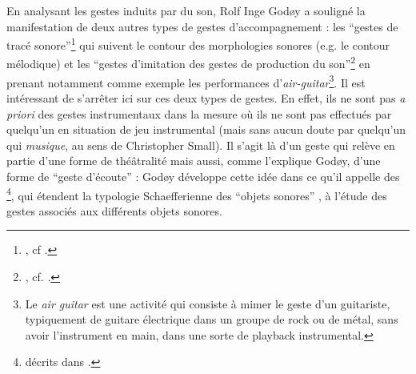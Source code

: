 \indent En analysant les gestes induits par du son, Rolf Inge Godøy a souligné la manifestation de deux autres types de gestes d'accompagnement : les ``gestes de tracé sonore''\footnote{, cf \cite{godoy_exploring_2006}.} qui suivent le contour des morphologies sonores (e.g. le contour mélodique) et les ``gestes d'imitation des gestes de production du son''\footnote{, cf. \cite{godoy_playing_2005}.} en prenant notamment comme exemple les performances d'\textit{air-guitar}\footnote{Le \textit{air guitar} est une activité qui consiste à mimer le geste d’un guitariste, typiquement de guitare électrique dans un groupe de rock ou de métal, sans avoir l’instrument en main, dans une sorte de playback instrumental.}. Il est intéressant de s'arrêter ici sur ces deux types de gestes. En effet, ils ne sont pas \textit{a priori} des gestes instrumentaux dans la mesure où ils ne sont pas effectués par quelqu'un en situation de jeu instrumental (mais sans aucun doute par quelqu'un qui \textit{musique}, au sens de Christopher Small). Il s'agit là d'un geste qui relève en partie d'une forme de théâtralité mais aussi, comme l'explique Godøy, d'une forme de ``geste d'écoute'' :  Godøy développe cette idée dans ce qu'il appelle des \footnote{ décrits dans \cite{godoy_gestural-sonorous_2006}.}, qui étendent la typologie Schaefferienne des ``objets sonores'' \cite{schaeffer_traite_1966}, à l'étude des gestes associés aux différents objets sonores.\\
